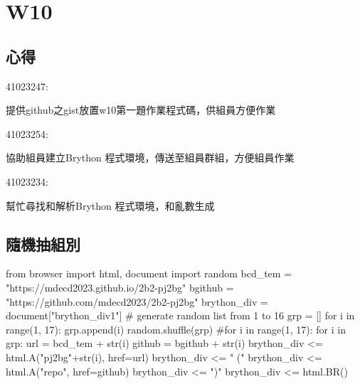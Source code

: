 \chapter{W10}
\section{心得}
41023247:

提供github之gist放置w10第一題作業程式碼，供組員方便作業

41023254:

協助組員建立Brython 程式環境，傳送至組員群組，方便組員作業

41023234:

幫忙尋找和解析Brython 程式環境，和亂數生成
\section{隨機抽組別}
from browser import html, document
import random
bcd_tem = "https://mdecd2023.github.io/2b2-pj2bg"
bgithub = "https://github.com/mdecd2023/2b2-pj2bg"
brython_div = document["brython_div1"]
#  generate random list from 1 to 16
grp = []
for i in range(1, 17):
    grp.append(i)
random.shuffle(grp)
#for i in range(1, 17):
for i in grp:
    url = bcd_tem + str(i)
    github = bgithub + str(i)
    brython_div <= html.A("pj2bg"+str(i), href=url)
    brython_div <= " ("
    brython_div <= html.A("repo", href=github)
    brython_div <= ")"
    brython_div <= html.BR()